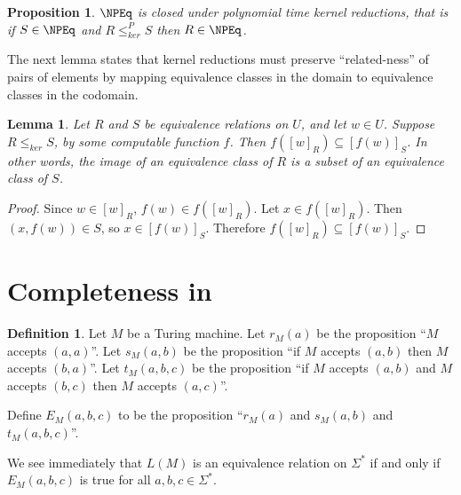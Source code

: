 \documentclass[draft]{article}
\newtheorem{lemma}[lemma]{Lemma}
\newtheorem{proposition}[proposition]{Proposition}
\theoremstyle{definition} \newtheorem{openproblem}[openproblem]{Open problem}
\theoremstyle{definition} \newtheorem{definition}[definition]{Definition}
\theoremstyle{remark} \newtheorem{remark}{Remark}
\newcommand{\kr}{\leq^{P}_{ker}} %
\newcommand{\krnt}{\leq_{ker}} %
\begin{document}
\begin{proposition}\label{prop:closed_under_kr}
  $\NPEq$ is closed under polynomial time kernel reductions, that is if $S\in\NPEq$ and $R\kr S$ then $R\in\NPEq$.
\end{proposition}

The next lemma states that kernel reductions must preserve ``related-ness'' of pairs of elements by mapping equivalence classes in the domain to equivalence classes in the codomain.

\begin{lemma}\label{lem:image}
  Let $R$ and $S$ be equivalence relations on $U$, and let $w\in U$.
  Suppose $R\krnt S$, by some computable function $f$.
  Then $f([w]_R)\subseteq [f(w)]_S$.
  In other words, the image of an equivalence class of $R$ is a subset of an equivalence class of $S$.
\end{lemma}
\begin{proof}
  Since $w\in [w]_R$, $f(w)\in f([w]_R)$.
  Let $x\in f([w]_R)$.
  Then $(x, f(w))\in S$, so $x\in [f(w)]_S$.
  Therefore $f([w]_R)\subseteq [f(w)]_S$.
\end{proof}

\section{Completeness in \texorpdfstring{\coNPEq}{coNPEq}}

\begin{definition}
  Let $M$ be a Turing machine.
  Let $r_M(a)$ be the proposition ``$M$ accepts $(a, a)$''.
  Let $s_M(a, b)$ be the proposition ``if $M$ accepts $(a, b)$ then $M$ accepts $(b, a)$''.
  Let $t_M(a, b, c)$ be the proposition ``if $M$ accepts $(a, b)$ and $M$ accepts $(b, c)$ then $M$ accepts $(a, c)$''.

  Define $E_M(a, b, c)$ to be the proposition ``$r_M(a)$ and $s_M(a, b)$ and $t_M(a, b, c)$''.
\end{definition}

We see immediately that $L(M)$ is an equivalence relation on $\Sigma^*$ if and only if $E_M(a, b, c)$ is true for all $a,b,c\in\Sigma^*$.
\end{document}
